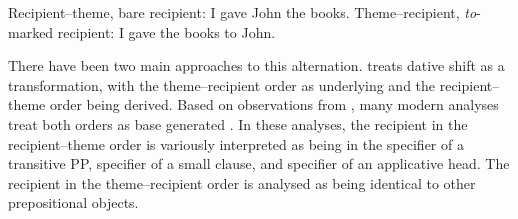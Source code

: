 \begin{exe}
\ex \label{ex:dative-shift}
\begin{xlist}
\ex Recipient--theme, bare recipient: I gave John the books.
\ex Theme--recipient, \textit{to}-marked recipient: I gave the books to John.
\end{xlist}
\end{exe}

There have been two main approaches to this alternation. \cite{Larson.1988} treats dative shift as a transformation, with the theme--recipient order as underlying and the recipient--theme order being derived. Based on observations from \cite{Oehrle.1976}, many modern analyses treat both orders as base generated \citep[and others]{Kayne.1984,Gropen.1989,Pinker.1989,Jackendoff.1990,Bowers.1993,Hale.1993,DenDikken.1995,Harley.2002,Bruening.2010,Bruening.2010b,Bruening.2014}. In these analyses, the recipient in the recipient--theme order is variously interpreted as being in the specifier of a transitive PP, specifier of a small clause, and specifier of an applicative head. The recipient in the theme--recipient order is analysed as being identical to other prepositional objects.

